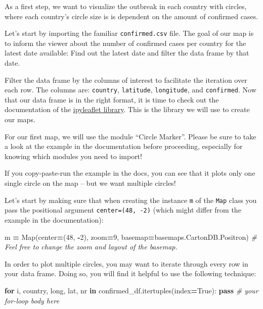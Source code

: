 \documentclass[
  11pt,
]{article}
\newenvironment{Shaded}{\begin{snugshade}}{\end{snugshade}}
\newcommand{\BuiltInTok}[1]{#1}
\newcommand{\CommentTok}[1]{\textcolor[rgb]{0.56,0.35,0.01}{\textit{#1}}}
\newcommand{\ControlFlowTok}[1]{\textcolor[rgb]{0.13,0.29,0.53}{\textbf{#1}}}
\newcommand{\DecValTok}[1]{\textcolor[rgb]{0.00,0.00,0.81}{#1}}
\newcommand{\KeywordTok}[1]{\textcolor[rgb]{0.13,0.29,0.53}{\textbf{#1}}}
\newcommand{\NormalTok}[1]{#1}
\newcommand{\OperatorTok}[1]{\textcolor[rgb]{0.81,0.36,0.00}{\textbf{#1}}}
\newcommand{\VariableTok}[1]{\textcolor[rgb]{0.00,0.00,0.00}{#1}}
\newenvironment{tipsp}[1]
  {
  \begin{itemize}
  \footnotesize
  \renewcommand{\labelitemi}{
    \raisebox{-.7\height}[0pt][0pt]{
      {\setkeys{Gin}{width=3em,keepaspectratio}
        \texttt{[image: images/\#1.png]}}
    }
  }
  \setlength{\fboxsep}{1em}
  \begin{pbox}
  \item
  }
  {
  \end{pbox}
  \end{itemize}
  }
\begin{document}
\begin{tipsp}p

As a first step, we want to visualize the outbreak in each country with circles, where each country's circle size is is dependent on the amount of confirmed cases.

Let's start by importing the familiar \texttt{confirmed.csv} file.
The goal of our map is to inform the viewer about the number of confirmed cases per country for the latest date available: Find out the latest date and filter the data frame by that date.

Filter the data frame by the columns of interest to facilitate the iteration over each row. The columns are: \texttt{country}, \texttt{latitude}, \texttt{longitude}, and \texttt{confirmed}.
Now that our data frame is in the right format, it is time to check out the documentation of the \href{https://ipyleaflet.readthedocs.io/en/latest/}{ipyleaflet library}. This is the library we will use to create our maps.

For our first map, we will use the module ``Circle Marker''. Please be sure to take a look at the example in the documentation before proceeding, especially for knowing which modules you need to import!

If you copy-paste-run the example in the docs, you can see that it plots only one single circle on the map -- but we want multiple circles!

Let's start by making sure that when creating the instance \texttt{m} of the \texttt{Map} class you pass the positional argument \texttt{center=(48,\ -2)} (which might differ from the example in the documentation):

\begin{Shaded}
\begin{Highlighting}[]
\NormalTok{m }\OperatorTok{=}\NormalTok{ Map(center}\OperatorTok{=}\NormalTok{(}\DecValTok{48}\NormalTok{, }\OperatorTok{{-}}\DecValTok{2}\NormalTok{), zoom}\OperatorTok{=}\DecValTok{9}\NormalTok{, basemap}\OperatorTok{=}\NormalTok{basemaps.CartonDB.Positron)}
\CommentTok{\# Feel free to change the zoom and layout of the basemap.}
\end{Highlighting}
\end{Shaded}

In order to plot multiple circles, you may want to iterate through every row in your data frame. Doing so, you will find it helpful to use the following technique:

\begin{Shaded}
\begin{Highlighting}[]
\ControlFlowTok{for}\NormalTok{ i, country, }\BuiltInTok{long}\NormalTok{, lat, nr }\KeywordTok{in}\NormalTok{ confirmed\_df.itertuples(index}\OperatorTok{=}\VariableTok{True}\NormalTok{):}
    \ControlFlowTok{pass}  \CommentTok{\# your for{-}loop body here}
\end{Highlighting}
\end{Shaded}


\end{tipsp}
\end{document}

